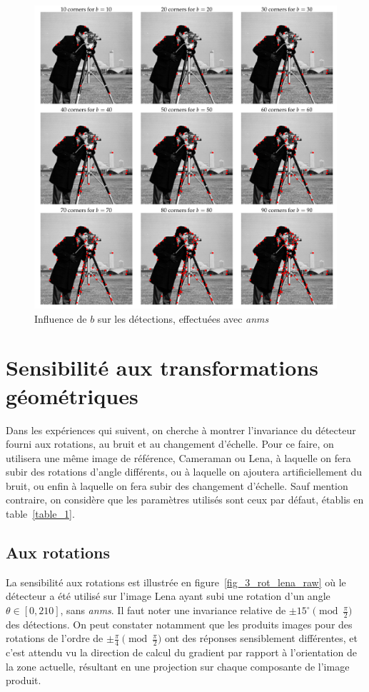 \documentclass[12pt,a4paper,onecolumn]{article}
\begin{document}
\begin{figure}[H]
	\centering
	\includegraphics[width = 1.0\textwidth]{2_cameraman_b}
	\caption{Influence de \(b\) sur les détections, effectuées avec \textit{anms}}
	\label{fig_2_b}
\end{figure}

\section{Sensibilité aux transformations géométriques}

Dans les expériences qui suivent, on cherche à montrer l'invariance du détecteur fourni aux rotations, au bruit et au changement d'échelle. Pour ce faire, on utilisera une même image de référence, Cameraman ou Lena, à laquelle on fera subir des rotations d'angle différents, ou à laquelle on ajoutera artificiellement du bruit, ou enfin à laquelle on fera subir des changement d'échelle. Sauf mention contraire, on considère que les paramètres utilisés sont ceux par défaut, établis en table~\ref{table_1}.


\subsection{Aux rotations}

La sensibilité aux rotations est illustrée en figure~\ref{fig_3_rot_lena_raw} où le détecteur a été utilisé sur l'image Lena ayant subi une rotation d'un angle \(\theta \in [0, 210]\), sans \textit{anms}. Il faut noter une invariance relative de \( \pm 15^{\circ}\pmod{\frac{\pi}{2}}\) des détections. On peut constater notamment que les produits images pour des rotations de l'ordre de \( \pm \frac{\pi}{4}\pmod{\frac{\pi}{2}}\) ont des réponses sensiblement différentes, et c'est attendu vu la direction de calcul du gradient par rapport à l'orientation de la zone actuelle, résultant en une projection sur chaque composante de l'image produit.
\end{document}
